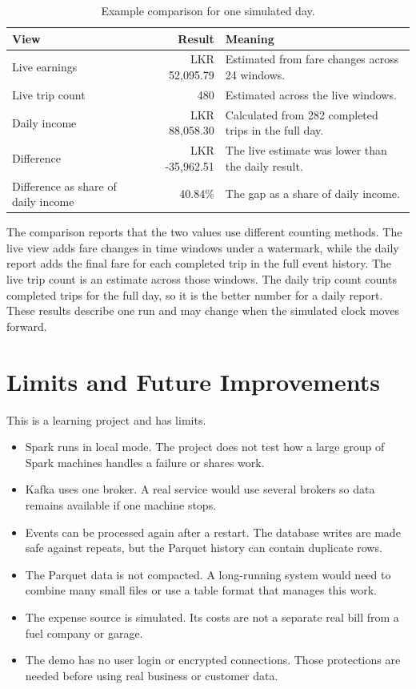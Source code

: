 \documentclass[11pt,a4paper]{article}
\begin{document}
\begin{table}[htbp]\centering\small
\caption{Example comparison for one simulated day.}
\begin{tabularx}{\textwidth}{@{}p{4.2cm}rX@{}}
\toprule
\textbf{View} & \textbf{Result} & \textbf{Meaning}\\
\midrule
Live earnings & LKR 52,095.79 & Estimated from fare changes across 24 windows.\\
Live trip count & 480 & Estimated across the live windows.\\
Daily income & LKR 88,058.30 & Calculated from 282 completed trips in the full day.\\
Difference & LKR -35,962.51 & The live estimate was lower than the daily result.\\
Difference as share of daily income & 40.84\% & The gap as a share of daily income.\\
\bottomrule
\end{tabularx}
\end{table}

The comparison reports that the two values use different counting methods. The live view adds
fare changes in time windows under a watermark, while the daily report adds the final fare for
each completed trip in the full event history. The live trip count is an estimate across those
windows. The daily trip count counts completed trips for the full day, so it is the better number
for a daily report. These results describe one run and may change when the simulated clock moves
forward.

\section{Limits and Future Improvements}

This is a learning project and has limits.

\begin{itemize}
  \item Spark runs in local mode. The project does not test how a large group of Spark machines
  handles a failure or shares work.
  \item Kafka uses one broker. A real service would use several brokers so data remains available
  if one machine stops.
  \item Events can be processed again after a restart. The database writes are made safe against
  repeats, but the Parquet history can contain duplicate rows.
  \item The Parquet data is not compacted. A long-running system would need to combine many small
  files or use a table format that manages this work.
  \item The expense source is simulated. Its costs are not a separate real bill from a fuel company
  or garage.
  \item The demo has no user login or encrypted connections. Those protections are needed before
  using real business or customer data.
\end{itemize}
\end{document}
